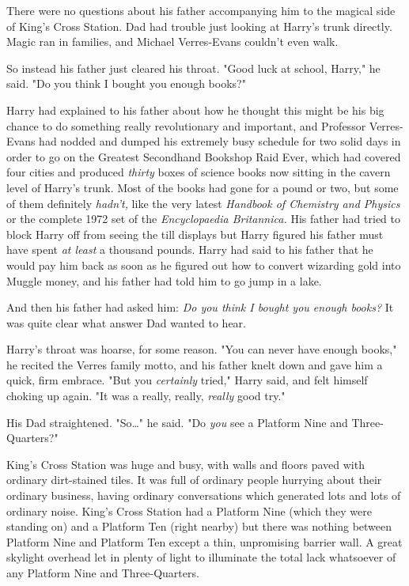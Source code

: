 There were no questions about his father accompanying him to the magical side 
of King's Cross Station. Dad had trouble just looking at Harry's trunk 
directly. Magic ran in families, and Michael Verres-Evans couldn't even walk.

So instead his father just cleared his throat. "Good luck at school, Harry," he 
said. "Do you think I bought you enough books?"

Harry had explained to his father about how he thought this might be his big 
chance to do something really revolutionary and important, and Professor 
Verres-Evans had nodded and dumped his extremely busy schedule for two solid 
days in order to go on the Greatest Secondhand Bookshop Raid Ever, which had 
covered four cities and produced \emph{thirty} boxes of science books now 
sitting in the cavern level of Harry's trunk. Most of the books had gone for a 
pound or two, but some of them definitely \emph{hadn't,} like the very latest 
\emph{Handbook of Chemistry and Physics} or the complete 1972 set of the 
\emph{Encyclopaedia Britannica.} His father had tried to block Harry off from 
seeing the till displays but Harry figured his father must have spent \emph{at 
least} a thousand pounds. Harry had said to his father that he would pay him 
back as soon as he figured out how to convert wizarding gold into Muggle money, 
and his father had told him to go jump in a lake.

And then his father had asked him: \emph{Do you think I bought you enough 
books?} It was quite clear what answer Dad wanted to hear.

Harry's throat was hoarse, for some reason. "You can never have enough books," 
he recited the Verres family motto, and his father knelt down and gave him a 
quick, firm embrace. "But you \emph{certainly} tried," Harry said, and felt 
himself choking up again. "It was a really, really, \emph{really} good try."

His Dad straightened. "So{\ldots}" he said. "Do \emph{you} see a Platform Nine 
and Three-Quarters?"

King's Cross Station was huge and busy, with walls and floors paved with 
ordinary dirt-stained tiles. It was full of ordinary people hurrying about 
their ordinary business, having ordinary conversations which generated lots and 
lots of ordinary noise. King's Cross Station had a Platform Nine (which they 
were standing on) and a Platform Ten (right nearby) but there was nothing 
between Platform Nine and Platform Ten except a thin, unpromising barrier wall. 
A great skylight overhead let in plenty of light to illuminate the total lack 
whatsoever of any Platform Nine and Three-Quarters.

